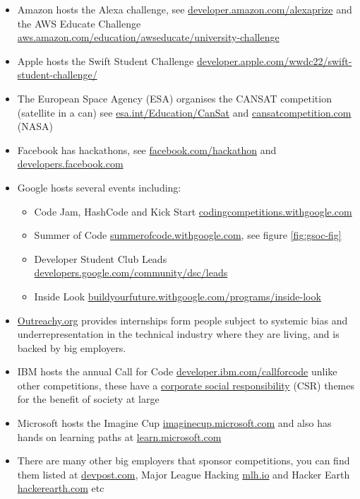 \documentclass[
]{book}
\providecommand{\tightlist}{%
  \setlength{\itemsep}{0pt}\setlength{\parskip}{0pt}}
\begin{document}
\begin{itemize}
\tightlist
\item
  Amazon hosts the Alexa challenge, see \href{https://developer.amazon.com/alexaprize/challenges/current-challenge/rules}{developer.amazon.com/alexaprize} and the AWS Educate Challenge \href{https://aws.amazon.com/education/awseducate/university-challenge/}{aws.amazon.com/education/awseducate/university-challenge}
\item
  Apple hosts the Swift Student Challenge \href{https://developer.apple.com/wwdc22/swift-student-challenge/}{developer.apple.com/wwdc22/swift-student-challenge/}
\item
  The European Space Agency (ESA) organises the CANSAT competition (satellite in a can) see \href{https://www.esa.int/Education/CanSat}{esa.int/Education/CanSat} and \href{http://www.cansatcompetition.com/}{cansatcompetition.com} (NASA)
\item
  Facebook has hackathons, see \href{https://en-gb.facebook.com/hackathon}{facebook.com/hackathon} and \href{https://developers.facebook.com/}{developers.facebook.com}
\item
  Google hosts several events including:

  \begin{itemize}
  \tightlist
  \item
    Code Jam, HashCode and Kick Start \href{https://codingcompetitions.withgoogle.com/}{codingcompetitions.withgoogle.com}
  \item
    Summer of Code \href{https://summerofcode.withgoogle.com/}{summerofcode.withgoogle.com}, see figure \ref{fig:gsoc-fig} \citep{gsoc}
  \item
    Developer Student Club Leads \href{https://developers.google.com/community/dsc/leads}{developers.google.com/community/dsc/leads}
  \item
    Inside Look \href{https://buildyourfuture.withgoogle.com/programs/inside-look/}{buildyourfuture.withgoogle.com/programs/inside-look}
  \end{itemize}
\item
  \href{https://www.outreachy.org/}{Outreachy.org} provides internships form people subject to systemic bias and underrepresentation in the technical industry where they are living, and is backed by big employers.
\item
  IBM hosts the annual Call for Code \href{https://developer.ibm.com/callforcode}{developer.ibm.com/callforcode} unlike other competitions, these have a \href{https://en.wikipedia.org/wiki/Corporate_social_responsibility}{corporate social responsibility} (CSR) themes for the benefit of society at large
\item
  Microsoft hosts the Imagine Cup \href{https://imaginecup.microsoft.com/}{imaginecup.microsoft.com} and also has hands on learning paths at \href{https://learn.microsoft.com/}{learn.microsoft.com}
\item
  There are many other big employers that sponsor competitions, you can find them listed at \href{https://devpost.com}{devpost.com}, Major League Hacking \href{https://mlh.io/}{mlh.io} and Hacker Earth \href{https://www.hackerearth.com/}{hackerearth.com} etc
\end{itemize}
\end{document}
